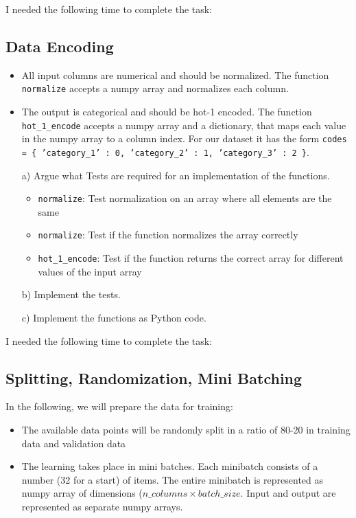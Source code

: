 \documentclass{article}
\begin{document}
I needed the following time to complete the task:

\subsection{Data Encoding}

\begin{itemize}
\item All input columns are numerical and should be normalized. The function \texttt{normalize} accepts a numpy array and normalizes each column. 
\item The output is categorical and should be hot-1 encoded. The function \texttt{hot\_1\_encode} accepts a numpy array and a dictionary, that maps each value in the numpy array to a column index. For our dataset it has the form \texttt{codes = \{ 'category\_1' : 0, 'category\_2' : 1, 'category\_3' : 2 \}}.
\end{itemize}

\begin{enumerate}

\item[a)] Argue what Tests are required for an implementation of the functions. 
\begin{itemize}
    \item \texttt{normalize}: Test normalization on an array where all elements are the same
    \item \texttt{normalize}: Test if the function normalizes the array correctly
    \item \texttt{hot\_1\_encode}: Test if the function returns the correct array for different values of the input array
\end{itemize}

\item[b)] Implement the tests.

\item[c)] Implement the functions as Python code.

\end{enumerate}

I needed the following time to complete the task:

\subsection{Splitting, Randomization, Mini Batching}

In the following, we will prepare the data for training:

\begin{itemize}
\item The available data points will be randomly split in a ratio of 80-20 in training data and validation data
\item The learning takes place in mini batches. Each minibatch consists of a number (32 for a start) of items. The entire minibatch is represented as numpy array of dimensions ($n\_columns \times batch\_size $. Input and output are represented as separate numpy arrays. 
\end{itemize}
\end{document}
